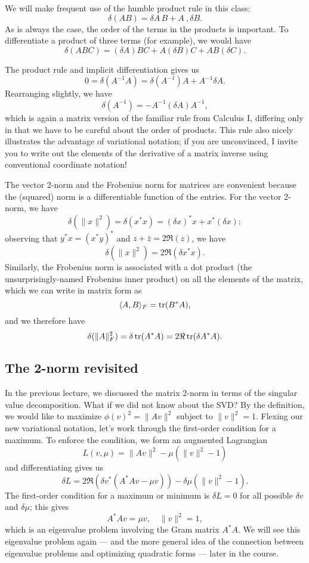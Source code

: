 We will make frequent use of the humble product rule in this class:
\[
  \delta (AB) = \delta A \, B + A \ ,\delta B.
\]
As is always the case, the order of the terms in the products is
important.  To differentiate a product of three terms (for example),
we would have
\[
  \delta (ABC) = (\delta A) BC + A (\delta B) C + AB(\delta C).
\]

The product rule and implicit differentiation gives us
\[
  0 = \delta (A^{-1} A) = \delta (A^{-1}) A + A^{-1} \delta A.
\]
Rearranging slightly, we have
\[
  \delta (A^{-1}) = -A^{-1} (\delta A) A^{-1},
\]
which is again a matrix version of the familiar rule from Calculus I,
differing only in that we have to be careful about the order of
products.  This rule also nicely illustrates the advantage of variational
notation; if you are unconvinced, I invite you to write out the
elements of the derivative of a matrix inverse using conventional
coordinate notation!

The vector 2-norm and the Frobenius norm for matrices are convenient
because the (squared) norm is a differentiable function of the entries.
For the vector 2-norm, we have
\[
  \delta(\|x\|^2) = \delta(x^* x) = (\delta x)^* x + x^* (\delta x);
\]
observing that $y^* x = (x^* y)^*$ and $z + \bar{z} = 2 \Re(z)$,
we have
\[
  \delta(\|x\|^2) = 2 \Re(\delta x^* x).
\]
Similarly, the Frobenius norm is associated with a dot product
(the unsurprisingly-named Frobenius inner product) on all the elements
of the matrix, which we can write in matrix form as
\[
  \langle A, B \rangle_F = \operatorname{tr}(B^* A),
\]
and we therefore have
\[
  \delta (\|A\|_F^2) = \delta \operatorname{tr}(A^* A) = 2 \Re \operatorname{tr}(\delta A^* A).
\]

\subsection{The 2-norm revisited}

In the previous lecture, we discussed the matrix 2-norm in terms
of the singular value decomposition.  What if we did not know about
the SVD?  By the definition, we would like to maximize
$\phi(v)^2 = \|Av\|^2$ subject to $\|v\|^2 = 1$.  Flexing our
new variational notation, let's work through the first-order condition
for a maximum.  To enforce the condition, we form an augmented
Lagrangian
\[
  L(v,\mu) = \|Av\|^2 - \mu (\|v\|^2 - 1)
\]
and differentiating gives us
\[
  \delta L = 2 \Re (\delta v^* (A^* A v - \mu v)) - \delta \mu (\|v\|^2 - 1).
\]
The first-order condition for a maximum or minimum is $\delta L = 0$
for all possible $\delta v$ and $\delta \mu$; this gives
\[
  A^* A v = \mu v, \quad \|v\|^2 = 1,
\]
which is an eigenvalue problem involving the Gram matrix $A^* A$.
We will see this eigenvalue problem again --- and the more general idea
of the connection between eigenvalue problems and
optimizing quadratic forms --- later in the course.

